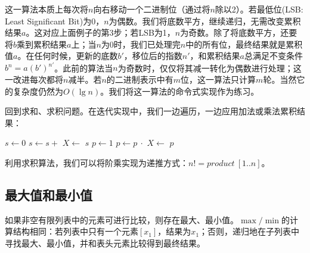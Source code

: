 \documentclass[b5paper]{ctexart}
\begin{document}
这一算法本质上每次将$n$向右移动一个二进制位（通过将$n$除以2）。若最低位(LSB: Least Significant Bit)为0，$n$为偶数。我们将底数平方，继续递归，无需改变累积结果$a$。这对应上面例子的第3步；若LSB为1，$n$为奇数。除了将底数平方，还要将$b$乘到累积结果$a$上；当$n$为0时，我们已处理完$n$中的所有位，最终结果就是累积值$a$。在任何时候，更新的底数$b'$，移位后的指数$n'$，和累积结果$a$总满足不变条件$b^n = a (b')^{n'}$。此前的算法当$n$为奇数时，仅仅将其减一转化为偶数进行处理；这一改进每次都将$n$减半。若$n$的二进制表示中有$m$位，这一算法只计算$m$轮。当然它的复杂度仍然为$O(\lg n)$。我们将这一算法的命令式实现作为练习。

回到求和、求积问题。在迭代实现中，我们一边遍历，一边应用加法或乘法累积结果：

\begin{algorithmic}[1]
  \State $s \gets 0$
    \State $s \gets s +$ 
    \State $X \gets$ 
  \EndWhile
  \State \Return $s$
\EndFunction
\Statex
{}
  \State $p \gets 1$
    \State $p \gets p\ \cdot$ 
    \State $X \gets$ 
  \EndWhile
  \State \Return $p$
\EndFunction
\end{algorithmic}

利用求积算法，我们可以将阶乘实现为递推方式：$n! = product\ [1..n]$。

\subsection{最大值和最小值}
 

如果非空有限列表中的元素可进行比较，则存在最大、最小值。$\max/\min$的计算结构相同：若列表中只有一个元素$[x_1]$，结果为$x_1$；否则，递归地在子列表中寻找最大、最小值，并和表头元素比较得到最终结果。

\be
{}
\ee
\end{document}
